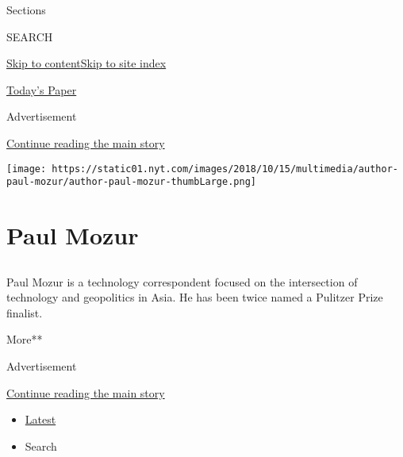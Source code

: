 Sections

SEARCH

\protect\hyperlink{site-content}{Skip to
content}\protect\hyperlink{site-index}{Skip to site index}

\href{https://myaccount.nytimes.com/auth/login?response_type=cookie\&client_id=vi}{}

\href{https://www.nytimes.com/section/todayspaper}{Today's Paper}

Advertisement

\protect\hyperlink{after-top}{Continue reading the main story}

\texttt{[image: https://static01.nyt.com/images/2018/10/15/multimedia/author-paul-mozur/author-paul-mozur-thumbLarge.png]}

\hypertarget{paul-mozur}{%
\section{Paul Mozur}\label{paul-mozur}}

\subsection{}

Paul Mozur is a technology correspondent focused on the intersection of
technology and geopolitics in Asia. He has been twice named a Pulitzer
Prize finalist.

More**

Advertisement

\protect\hyperlink{after-mid1}{Continue reading the main story}

\begin{itemize}
\tightlist
\item
  \protect\hyperlink{stream-panel}{Latest}
\item
  Search
\end{itemize}

